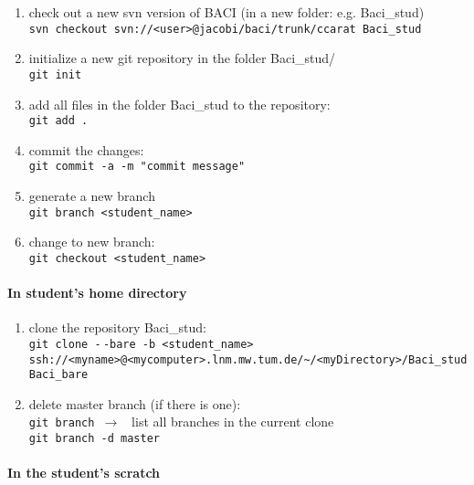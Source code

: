 \begin{enumerate}
  \item check out a new svn version of BACI (in a new folder: e.g. Baci\_stud)\\
  \texttt{svn checkout svn://<user>@jacobi/baci/trunk/ccarat Baci\_stud}
  \item initialize a new git repository in the folder Baci\_stud/  \\
  \texttt{git init}
  \item add all files in the folder Baci\_stud to the repository: \\
  \texttt{git add .}
  \item commit the changes: \\
  \texttt{git commit -a -m "commit message"}
  \item generate a new branch \\
  \texttt{git branch <student\_name>}
  \item change to new branch: \\
 \texttt{git checkout <student\_name>}
\end{enumerate}

\paragraph{In student's home directory}

\begin{enumerate}
  \item clone the repository Baci\_stud: \\
  \texttt{git clone -$\,$-bare -b <student\_name> \\
    \phantom{aaaa} ssh://<myname>@<mycomputer>.lnm.mw.tum.de/\~{}/<myDirectory>/Baci\_stud Baci\_bare}
  \item delete master branch (if there is one): \\
  \texttt{git branch $\rightarrow $ } list all branches in the current clone \\
  \texttt{git branch -d master} \\
\end{enumerate}

\paragraph{In the student's scratch}

